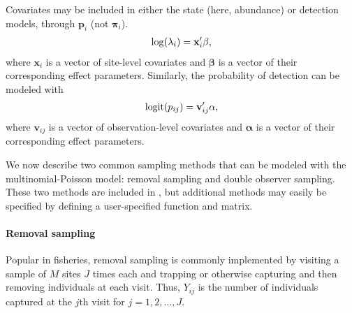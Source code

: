 \documentclass[article,shortnames]{jss}
\DeclareMathOperator{\logit}{logit}
\newcommand{\um}{\pkg{unmarked}}
\begin{document}
Covariates may be included in either the
state (here, abundance) or detection models, through $\mathbf p_{i}$
(not $\boldsymbol \pi_{i}$).
\begin{gather}
  \log(\lambda_i) = \mathbf x_i' \mathbf \beta, \notag
\end{gather}
where $\mathbf x_i$ is a vector of site-level covariates and $\mathbf \beta$
is a vector of their corresponding effect parameters.  Similarly, the
probability of detection can be modeled with
\begin{gather}
  \logit(p_{ij}) = \mathbf v_{ij}' \mathbf \alpha, \notag
\end{gather}
where $\mathbf v_{ij}$ is a vector of observation-level covariates and
$\mathbf \alpha$ is a vector of their corresponding effect parameters.

We now describe two common sampling methods that can be modeled
with the multinomial-Poisson model: removal sampling and double
observer sampling.  These two methods are included in \um, but
additional methods may easily be specified by defining a user-specified 
 function and  matrix.


\paragraph{Removal sampling }

Popular in fisheries, removal sampling is commonly implemented by 
visiting a sample of $M$ sites $J$ times each and trapping or 
otherwise capturing and then removing individuals at each visit.  Thus, 
$Y_{ij}$ is the number of individuals captured at the $j$th visit for 
$j=1,2,\dots,J$.
\end{document}
